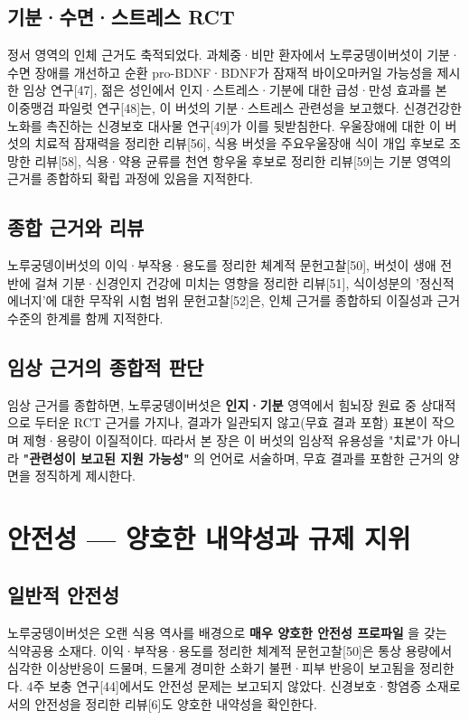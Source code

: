 \documentclass[11pt,oneside]{book}
\begin{document}
\subsection{기분·수면·스트레스 RCT}
정서 영역의 인체 근거도 축적되었다. 과체중·비만 환자에서 노루궁뎅이버섯이 기분·수면 장애를 개선하고 순환 pro-BDNF·BDNF가 잠재적 바이오마커일 가능성을 제시한 임상 연구[47], 젊은 성인에서 인지·스트레스·기분에 대한 급성·만성 효과를 본 이중맹검 파일럿 연구[48]는, 이 버섯의 기분·스트레스 관련성을 보고했다. 신경건강한 노화를 촉진하는 신경보호 대사물 연구[49]가 이를 뒷받침한다. 우울장애에 대한 이 버섯의 치료적 잠재력을 정리한 리뷰[56], 식용 버섯을 주요우울장애 식이 개입 후보로 조망한 리뷰[58], 식용·약용 균류를 천연 항우울 후보로 정리한 리뷰[59]는 기분 영역의 근거를 종합하되 확립 과정에 있음을 지적한다.

\subsection{종합 근거와 리뷰}
노루궁뎅이버섯의 이익·부작용·용도를 정리한 체계적 문헌고찰[50], 버섯이 생애 전반에 걸쳐 기분·신경인지 건강에 미치는 영향을 정리한 리뷰[51], 식이성분의 '정신적 에너지'에 대한 무작위 시험 범위 문헌고찰[52]은, 인체 근거를 종합하되 이질성과 근거 수준의 한계를 함께 지적한다.

\subsection{임상 근거의 종합적 판단}
임상 근거를 종합하면, 노루궁뎅이버섯은 \textbf{인지·기분} 영역에서 힘뇌장 원료 중 상대적으로 두터운 RCT 근거를 가지나, 결과가 일관되지 않고(무효 결과 포함) 표본이 작으며 제형·용량이 이질적이다. 따라서 본 장은 이 버섯의 임상적 유용성을 "치료"가 아니라 \textbf{"관련성이 보고된 지원 가능성"} 의 언어로 서술하며, 무효 결과를 포함한 근거의 양면을 정직하게 제시한다.

\section{안전성 — 양호한 내약성과 규제 지위}
\subsection{일반적 안전성}
노루궁뎅이버섯은 오랜 식용 역사를 배경으로 \textbf{매우 양호한 안전성 프로파일} 을 갖는 식약공용 소재다. 이익·부작용·용도를 정리한 체계적 문헌고찰[50]은 통상 용량에서 심각한 이상반응이 드물며, 드물게 경미한 소화기 불편·피부 반응이 보고됨을 정리한다. 4주 보충 연구[44]에서도 안전성 문제는 보고되지 않았다. 신경보호·항염증 소재로서의 안전성을 정리한 리뷰[6]도 양호한 내약성을 확인한다.
\end{document}
